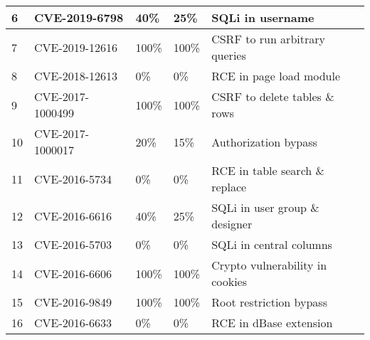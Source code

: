 \begin{table*}[]
\begin{adjustbox}{max width=0.65\textwidth}
\begin{tabular}{|lllll|}
    \multicolumn{1}{|l|}{6}           & \multicolumn{1}{l|}{CVE-2019-6798}    & \multicolumn{1}{l|}{40\%}                 & \multicolumn{1}{l|}{25\%}              & SQLi in username                \\ \hline
    \multicolumn{1}{|l|}{7}           & \multicolumn{1}{l|}{CVE-2019-12616}   & \multicolumn{1}{l|}{100\%}                & \multicolumn{1}{l|}{100\%}             & CSRF to run arbitrary queries   \\ \hline
    \multicolumn{1}{|l|}{8}           & \multicolumn{1}{l|}{CVE-2018-12613}   & \multicolumn{1}{l|}{0\%}                  & \multicolumn{1}{l|}{0\%}               & RCE in page load module         \\ \hline
    \multicolumn{1}{|l|}{9}           & \multicolumn{1}{l|}{CVE-2017-1000499} & \multicolumn{1}{l|}{100\%}                & \multicolumn{1}{l|}{100\%}             & CSRF to delete tables \& rows   \\ \hline
    \multicolumn{1}{|l|}{10}          & \multicolumn{1}{l|}{CVE-2017-1000017} & \multicolumn{1}{l|}{20\%}                 & \multicolumn{1}{l|}{15\%}              & Authorization bypass            \\ \hline
    \multicolumn{1}{|l|}{11}          & \multicolumn{1}{l|}{CVE-2016-5734}    & \multicolumn{1}{l|}{0\%}                  & \multicolumn{1}{l|}{0\%}               & RCE in table search \& replace  \\ \hline
    \multicolumn{1}{|l|}{12}          & \multicolumn{1}{l|}{CVE-2016-6616}    & \multicolumn{1}{l|}{40\%}                 & \multicolumn{1}{l|}{25\%}              & SQLi in user group \& designer  \\ \hline
    \multicolumn{1}{|l|}{13}          & \multicolumn{1}{l|}{CVE-2016-5703}    & \multicolumn{1}{l|}{0\%}                  & \multicolumn{1}{l|}{0\%}               & SQLi in central columns         \\ \hline
    \multicolumn{1}{|l|}{14}          & \multicolumn{1}{l|}{CVE-2016-6606}    & \multicolumn{1}{l|}{100\%}                & \multicolumn{1}{l|}{100\%}             & Crypto vulnerability in cookies \\ \hline
    \multicolumn{1}{|l|}{15}          & \multicolumn{1}{l|}{CVE-2016-9849}    & \multicolumn{1}{l|}{100\%}                & \multicolumn{1}{l|}{100\%}             & Root restriction bypass         \\ \hline
    \multicolumn{1}{|l|}{16}          & \multicolumn{1}{l|}{CVE-2016-6633}    & \multicolumn{1}{l|}{0\%}                  & \multicolumn{1}{l|}{0\%}               & RCE in dBase extension          \\ \hline

\end{tabular}
\end{adjustbox}
\end{table*}
